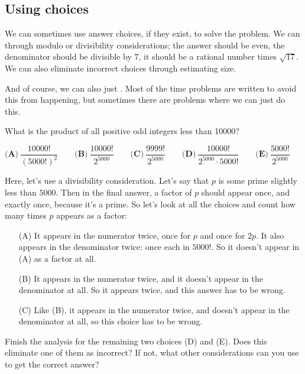 \documentclass[11pt,paper=letter]{scrartcl}
\begin{document}
\subsection{Using choices}

We can sometimes use answer choices, if they exist, to solve the problem. We can  through modulo or divisibility considerations; the answer should be even, the denominator should be divisible by $7$, it should be a rational number times $\sqrt{17}$. We can also eliminate incorrect choices through estimating size.

And of course, we can also just . Most of the time problems are written to avoid this from happening, but sometimes there are problems where we can just do this.

\begin{exboxed}[AMC 12 2001/5]
What is the product of all positive odd integers less than 10000?

\vspace{6pt} \noindent $\textbf{(A)}\ \dfrac{10000!}{(5000!)^2}\qquad
\textbf{(B)}\ \dfrac{10000!}{2^{5000}}\qquad
\textbf{(C)}\ \dfrac{9999!}{2^{5000}}\qquad
\textbf{(D)}\ \dfrac{10000!}{2^{5000} \cdot 5000!}\qquad
\textbf{(E)}\ \dfrac{5000!}{2^{5000}}$
\end{exboxed}

Here, let's use a divisibility consideration. Let's say that $p$ is some prime slightly less than $5000$. Then in the final answer, a factor of $p$ should appear once, and exactly once, because it's a prime. So let's look at all the choices and count how many times $p$ appears as a factor:

\begin{enumerate}
  \item[(A)] It appears in the numerator twice, once for $p$ and once for $2p$. It also appears in the denominator twice: once each in $5000!$. So it doesn't appear in (A) as a factor at all.

  \item[(B)] It appears in the numerator twice, and it doesn't appear in the denominator at all. So it appears twice, and this answer has to be wrong.

  \item[(C)] Like (B), it appears in the numerator twice, and doesn't appear in the denominator at all, so this choice has to be wrong.
\end{enumerate}
\vspace{-12pt}
\begin{exrboxed}
  Finish the analysis for the remaining two choices (D) and (E). Does this eliminate one of them as incorrect? If not, what other considerations can you use to get the correct answer?
\end{exrboxed}
\end{document}
